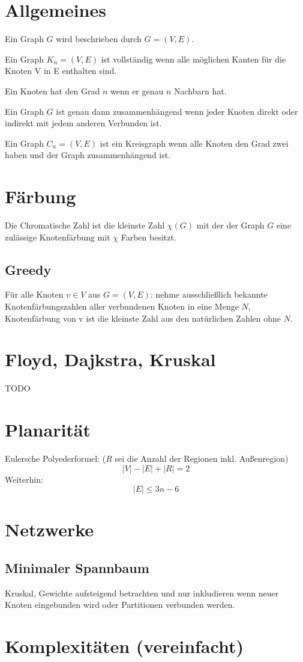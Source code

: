 \documentclass[10pt,a4paper]{article}
\begin{document}
\section{Allgemeines}
Ein Graph $G$ wird beschrieben durch $G = (V, E)$.

Ein Graph $K_n = (V, E)$ ist vollständig wenn alle möglichen Kanten für die Knoten V in E enthalten sind.

Ein Knoten hat den Grad $n$ wenn er genau $n$ Nachbarn hat.

Ein Graph $G$ ist genau dann zusammenhängend wenn jeder Knoten direkt oder indirekt mit jedem anderen Verbunden ist.

Ein Graph $C_n = (V, E)$ ist ein Kreisgraph wenn alle Knoten den Grad zwei haben und der Graph zusammenhängend ist.
\section{Färbung}
Die Chromatische Zahl ist die kleinste Zahl $\chi(G)$ mit der der Graph $G$ eine zulässige Knotenfärbung mit $\chi$ Farben besitzt.

\subsection{Greedy}
Für alle Knoten $v \in V$ aus $G = (V, E)$: nehme ausschließlich bekannte Knotenfärbungszahlen aller verbundenen Knoten in eine Menge $N$, Knotenfärbung von v ist die kleinste Zahl aus den natürlichen Zahlen ohne $N$.
\section{Floyd, Dajkstra, Kruskal}
TODO
\section{Planarität}
Eulersche Polyederformel: ($R$ sei die Anzahl der Regionen inkl. Außenregion)
\[|V|-|E|+|R|=2\]
Weiterhin:
\[|E| \leq 3n -6\]
\section{Netzwerke}
\subsection{Minimaler Spannbaum}
Kruskal, Gewichte aufsteigend betrachten und nur inkludieren wenn neuer Knoten eingebunden wird oder Partitionen verbunden werden.
\section{Komplexitäten (vereinfacht)}
\end{document}
